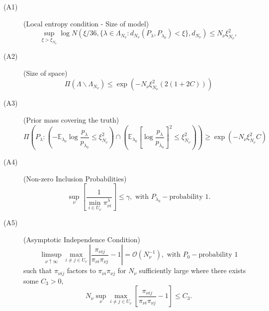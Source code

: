 \documentclass[]{imsart}
\newcommand{\order}[1]{\mathcal{O}(#1)}
\begin{document}
\begin{description}
\item[(A1)\label{existtests}] (Local entropy condition - Size of model)
        \begin{equation*}
        \mathop{\sup}_{\xi > \xi_{N_{\nu}}}\log N\left(\xi/36,\{\lambda\in\Lambda_{N_{\nu}}: d_{N_{\nu}}\left(P_{\lambda},P_{\lambda_{0}}\right) < \xi\},d_{N_{\nu}}\right) \leq N_{\nu} \xi_{N_{\nu}}^{2},
        \end{equation*}
\item[(A2)\label{sizespace}] (Size of space)
        \begin{equation*}
        \displaystyle\Pi\left(\Lambda\backslash\Lambda_{N_{\nu}}\right) \leq \exp\left(-N_{\nu}\xi^{2}_{N_{\nu}}\left(2(1+2C)\right)\right)
        \end{equation*}
\item[(A3)\label{priortruth}] (Prior mass covering the truth)
        \begin{equation*}
        \displaystyle\Pi\left(P_{\lambda}:
        \left(-\mathbb{E}_{\lambda_{0}}\log\frac{p_{\lambda}}{p_{\lambda_{0}}}\leq \xi^{2}_{N_{\nu}}\right)\cap \left(\mathbb{E}_{\lambda_{0}}\left[\log\frac{p_{\lambda}}{p_{\lambda_{0}}}\right]^{2}\leq \xi^{2}_{N_{\nu}} \right)\right) \geq \exp\left(-N_{\nu}\xi^{2}_{N_{\nu}}C\right)
        \end{equation*}
\item[(A4)\label{bounded}] (Non-zero Inclusion Probabilities)
        \begin{equation*}
        \displaystyle\mathop{\sup}_{\nu}\left[\frac{1}{\displaystyle\mathop{\min}_{i\in U_{\nu}}\pi_{\nu i}^{\lambda}}\right] \leq \gamma, \text{  with $P_{\lambda_{0}}-$probability $1$.}
        \end{equation*}
\item[(A5)\label{independence}] (Asymptotic Independence Condition)
        \begin{equation*}
        \displaystyle\mathop{\limsup}_{\nu\uparrow\infty} \mathop{\max}_{i \neq j\in U_{\nu}}\left\vert\frac{\pi_{\nu ij}}{\pi_{\nu i}\pi_{\nu j}} - 1\right\vert = \order{N_{\nu}^{-1}}, \text{  with $P_{0}-$probability $1$}
        \end{equation*}
        such that $\pi_{\nu ij}$ factors to $\pi_{\nu i}\pi_{\nu j}$ for $N_{\nu}$ sufficiently large where there exists some $C_{3} > 0$,
        \begin{equation*}
        \displaystyle N_{\nu}\mathop{\sup}_{\nu}\mathop{\max}_{i \neq j \in U_{\nu}}\left[\frac{\pi_{\nu ij}}{\pi_{\nu i}\pi_{\nu j}}-1\right] \leq C_{3}.

\end{equation*}
\end{description}
\end{document}
